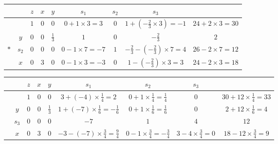 \documentclass[a4paper,12pt]{article}
\begin{document}
\begin{table}[h]
    \scriptsize
    \begin{tabular}{cc|cccccc|c}
            &       & $z$ & $x$ & $y$           & $s_1$                 & $s_2$ & $s_3$                                        &                        \\
        \hline
            &       & $1$ & $0$ & $0$           & $0 + 1 \times 3 = 3$  & $0$   & $1 + (-\frac{2}{3} \times 3) = -1$           & $24 + 2 \times 3 = 30$ \\
        \hline
            & $y$   & $0$ & $0$ & $\frac{1}{3}$ & $1$                   & $0$   & $-\frac{2}{3}$                               & $2$                    \\
        $*$ & $s_2$ & $0$ & $0$ & $0$           & $0 - 1 \times 7 = -7$ & $1$   & $-\frac{2}{3} - (-\frac{2}{3}) \times 7 = 4$ & $26 - 2 \times 7 = 12$ \\
            & $x$   & $0$ & $3$ & $0$           & $0 - 1 \times 3 = -3$ & $0$   & $1 - (-\frac{2}{3}) \times 3 = 3$            & $24 - 2 \times 3 = 18$ \\
    \end{tabular}
\end{table}

\begin{table}[h]
    \scriptsize
    \begin{tabular}{cc|cccccc|c}
         &       & $z$ & $x$ & $y$           & $s_1$                                        & $s_2$                                     & $s_3$                          &                                   \\
        \hline
         &       & $1$ & $0$ & $0$           & $3 + (-4) \times \frac{1}{4} = 2$            & $0 + 1 \times \frac{1}{4} = \frac{1}{4}$  & $0$                            & $30 + 12 \times \frac{1}{4} = 33$ \\
        \hline
         & $y$   & $0$ & $0$ & $\frac{1}{3}$ & $1 + (-7) \times \frac{1}{6} = -\frac{1}{6}$ & $0 + 1 \times \frac{1}{6} = \frac{1}{6}$  & $0$                            & $2 + 12 \times \frac{1}{6} = 4$   \\
         & $s_3$ & $0$ & $0$ & $0$           & $-7$                                         & $1$                                       & $4$                            & $12$                              \\
         & $x$   & $0$ & $3$ & $0$           & $-3 - (-7) \times \frac{3}{4} = \frac{9}{4}$ & $0 - 1 \times \frac{3}{4} = -\frac{3}{4}$ & $3 - 4 \times \frac{3}{4} = 0$ & $18 - 12 \times \frac{3}{4} = 9$  \\
    \end{tabular}
\end{table}
\end{document}
